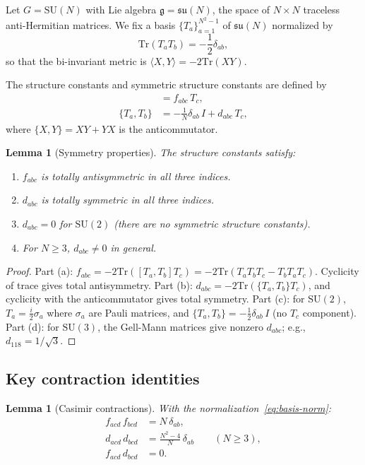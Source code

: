 \documentclass[11pt,a4paper]{article}
\theoremstyle{plain}
\newtheorem{lemma}[theorem]{Lemma}
\theoremstyle{definition}
\theoremstyle{remark}
\newcommand{\SU}{\mathrm{SU}}
\newcommand{\su}{\mathfrak{su}}
\newcommand{\Tr}{\mathrm{Tr}}
\newcommand{\ip}[2]{\langle #1, #2 \rangle}
\begin{document}
Let $G = \SU(N)$ with Lie algebra
$\mathfrak{g} = \su(N)$, the space of $N \times N$
traceless anti-Hermitian matrices. We fix a basis $\{T_a\}_{a=1}^{N^2-1}$
of $\su(N)$ normalized by
\begin{equation}\label{eq:basis-norm}
\Tr(T_a T_b) = -\frac{1}{2}\delta_{ab},
\end{equation}
so that the bi-invariant metric is
$\ip{X}{Y} = -2\Tr(XY)$.

The structure constants and symmetric structure constants are
defined by
\begin{align}
[T_a, T_b] &= f_{abc}\,T_c, \label{eq:f-def}\\
\{T_a, T_b\} &= -\frac{1}{N}\delta_{ab}\,I + d_{abc}\,T_c,
\label{eq:d-def}
\end{align}
where $\{X,Y\} = XY + YX$ is the anticommutator.

\begin{lemma}[Symmetry properties]\label{lem:fd-symmetry}
The structure constants satisfy:
\begin{enumerate}[label=(\alph*)]
\item $f_{abc}$ is totally antisymmetric in all three indices.
\item $d_{abc}$ is totally symmetric in all three indices.
\item $d_{abc} = 0$ for $\SU(2)$ (there are no symmetric
  structure constants).
\item For $N \geq 3$, $d_{abc} \neq 0$ in general.
\end{enumerate}
\end{lemma}

\begin{proof}
Part (a): $f_{abc} = -2\Tr([T_a,T_b]T_c)
= -2\Tr(T_a T_b T_c - T_b T_a T_c)$. Cyclicity of trace gives
total antisymmetry. Part (b): $d_{abc} = -2\Tr(\{T_a,T_b\}T_c)$,
and cyclicity with the anticommutator gives total symmetry.
Part (c): for $\SU(2)$, $T_a = \frac{i}{2}\sigma_a$ where
$\sigma_a$ are Pauli matrices, and $\{T_a,T_b\} = -\frac{1}{2}
\delta_{ab}\,I$ (no $T_c$ component). Part (d): for
$\SU(3)$, the Gell-Mann matrices give nonzero $d_{abc}$; e.g.,
$d_{118} = 1/\sqrt{3}$.
\end{proof}


\subsection{Key contraction identities}

\begin{lemma}[Casimir contractions]\label{lem:casimirs}
With the normalization~\eqref{eq:basis-norm}:
\begin{align}
f_{acd}\,f_{bcd} &= N\,\delta_{ab},
\label{eq:ff-contraction}\\
d_{acd}\,d_{bcd} &= \frac{N^2 - 4}{N}\,\delta_{ab}
\qquad (N \geq 3),
\label{eq:dd-contraction}\\
f_{acd}\,d_{bcd} &= 0.
\label{eq:fd-contraction}
\end{align}
\end{lemma}
\end{document}
